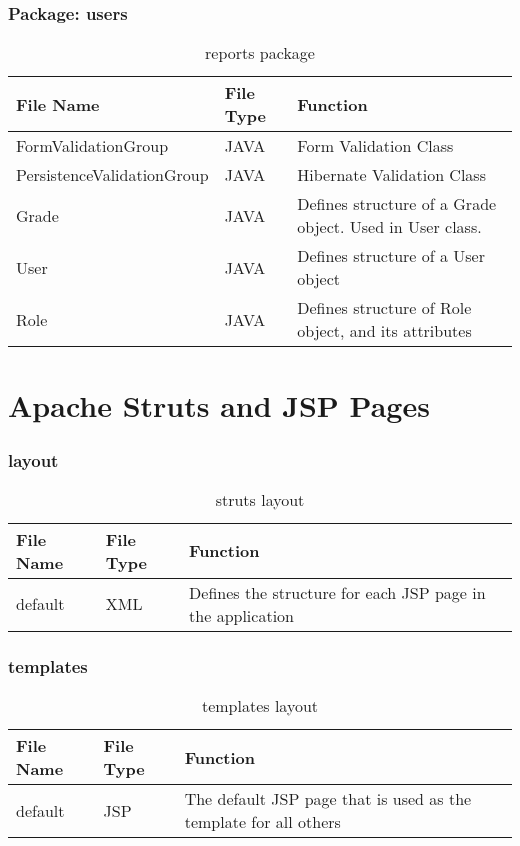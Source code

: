 \subsubsection{Package: users}
\begin{table}[H]
\begin{center}
    \begin{tabular}{| l | l | p{5cm} |}
    \hline
    File Name & File Type & Function\\ \hline
    FormValidationGroup & JAVA & Form Validation Class\\ \hline
	PersistenceValidationGroup & JAVA & Hibernate Validation Class\\ \hline
	Grade & JAVA & Defines structure of a Grade object. Used in  User class.\\ \hline
	User & JAVA & Defines structure of a User object\\ \hline
	Role & JAVA & Defines structure of Role object, and its attributes\\ \hline	
    \end{tabular}
\end{center}
\caption{reports package}
\end{table}

\section{Apache Struts and JSP Pages}

\subsubsection{layout}
\begin{table}[H]
\begin{center}
    \begin{tabular}{| l | l | p{5cm} |}
    \hline
    File Name & File Type & Function\\ \hline
	default & XML & Defines the structure for each JSP page in the application\\ \hline	
    \end{tabular}
\end{center}
\caption{struts layout}
\end{table}

\subsubsection{templates}
\begin{table}[H]
\begin{center}
    \begin{tabular}{| l | l | p{5cm} |}
    \hline
    File Name & File Type & Function\\ \hline
	default & JSP & The default JSP page that is used as the template for all others\\ \hline	
    \end{tabular}
\end{center}
\caption{templates layout}
\end{table}


